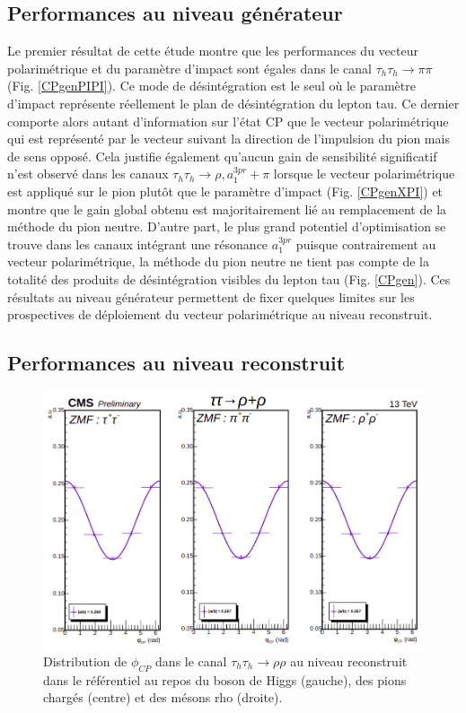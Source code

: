 \subsection{Performances au niveau générateur}

Le premier résultat de cette étude montre que les performances du vecteur polarimétrique et du paramètre d'impact sont égales dans le canal $\tau_h\tau_h\rightarrow\pi\pi$ (Fig. \ref{CPgenPIPI}). Ce mode de désintégration est le seul où le paramètre d'impact représente réellement le plan de désintégration du lepton tau. Ce dernier comporte alors autant d'information sur l'état CP que le vecteur polarimétrique qui est représenté par le vecteur suivant la direction de l'impulsion du pion mais de sens opposé. Cela justifie également qu'aucun gain de sensibilité significatif n'est observé dans les canaux $\tau_h\tau_h\rightarrow\rho,a_1^{3pr}+\pi$ lorsque le vecteur polarimétrique est appliqué sur le pion plutôt que le paramètre d'impact (Fig. \ref{CPgenXPI}) et montre que le gain global obtenu est majoritairement lié au remplacement de la méthode du pion neutre. D'autre part, le plus grand potentiel d'optimisation se trouve dans les canaux intégrant une résonance $a_1^{3pr}$ puisque contrairement au vecteur polarimétrique, la méthode du pion neutre ne tient pas compte de la totalité des produits de désintégration visibles du lepton tau (Fig. \ref{CPgen}). Ces résultats au niveau générateur permettent de fixer quelques limites sur les prospectives de déploiement du vecteur polarimétrique au niveau reconstruit.  \\ 




\subsection{Performances au niveau reconstruit}

\begin{figure}[!ht]
    \centering
    \includegraphics[scale=0.37]{Chapitre6/Images/ZMFreco.png} 
  \caption{Distribution de $\phi_{CP}$ dans le canal $\tau_h\tau_h\rightarrow\rho\rho$ au niveau reconstruit dans le référentiel au repos du boson de Higgs (gauche), des pions chargés (centre) et des mésons rho (droite).}
  \label{ZMFreco}
\end{figure}

